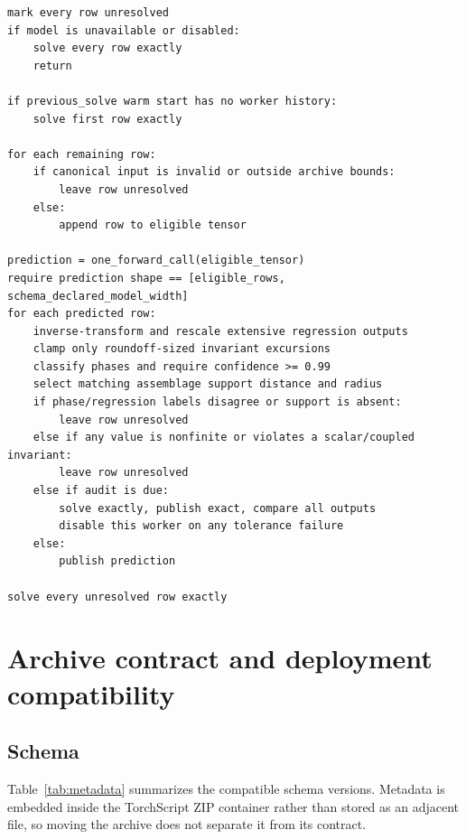 \documentclass[11pt]{article}
\begin{document}
\begin{lstlisting}[caption={Neural evaluation of one worker batch.},label={lst:inference}]
mark every row unresolved
if model is unavailable or disabled:
    solve every row exactly
    return

if previous_solve warm start has no worker history:
    solve first row exactly

for each remaining row:
    if canonical input is invalid or outside archive bounds:
        leave row unresolved
    else:
        append row to eligible tensor

prediction = one_forward_call(eligible_tensor)
require prediction shape == [eligible_rows, schema_declared_model_width]
for each predicted row:
    inverse-transform and rescale extensive regression outputs
    clamp only roundoff-sized invariant excursions
    classify phases and require confidence >= 0.99
    select matching assemblage support distance and radius
    if phase/regression labels disagree or support is absent:
        leave row unresolved
    else if any value is nonfinite or violates a scalar/coupled invariant:
        leave row unresolved
    else if audit is due:
        solve exactly, publish exact, compare all outputs
        disable this worker on any tolerance failure
    else:
        publish prediction

solve every unresolved row exactly
\end{lstlisting}

\section{Archive contract and deployment compatibility}

\subsection{Schema}

Table~\ref{tab:metadata} summarizes the compatible schema versions.  Metadata is embedded inside the
TorchScript ZIP container rather than stored as an adjacent file, so moving the archive does not
separate it from its contract.
\end{document}
